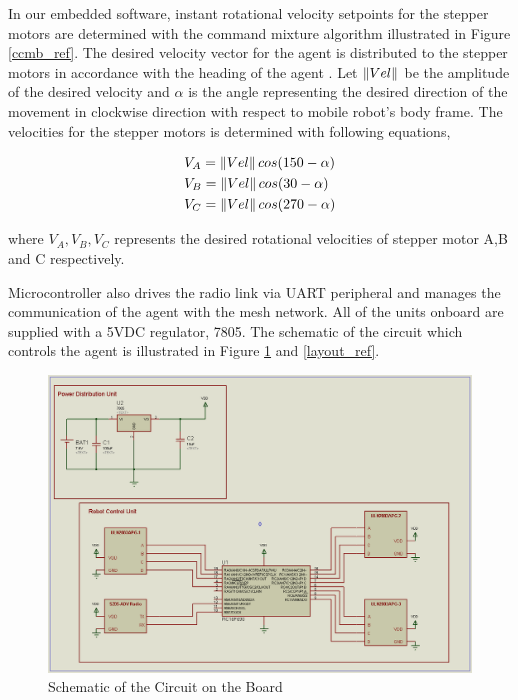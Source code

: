 In our embedded software, instant rotational velocity setpoints for the stepper motors  are determined with the command mixture algorithm illustrated in Figure \ref{ccmb_ref}. The desired velocity vector for the agent is  distributed to the stepper motors in accordance with the heading of the agent . Let $\left\lVert Vel\right\rVert$ be the amplitude of the desired velocity and $\alpha$ is the angle representing the desired direction of the movement in clockwise direction with respect to mobile robot's body frame.  The velocities for the stepper motors is determined with following equations,
		
\begin{align*}
& V_A = \left\lVert Vel\right\rVert cos(150-\alpha) \\
& V_B = \left\lVert Vel\right\rVert cos(30 -\alpha) \\
& V_C = \left\lVert Vel\right\rVert cos(270-\alpha) 
\end{align*}  

where $V_A, V_B, V_C$ represents the desired rotational velocities of  stepper motor A,B and C respectively.
		
Microcontroller also drives the radio link via UART peripheral and manages the communication of the agent with the mesh network. All of the units onboard are supplied with a 5VDC regulator, 7805. The schematic of the circuit which controls the agent is illustrated in Figure \ref{sematik_ref} and \ref{layout_ref}.
		
\begin{figure}[H]
\caption{Schematic of the Circuit on the Board} \label{sematik_ref}
\centerline{\includegraphics[scale = 0.40]{sematik}}
\end{figure} 

